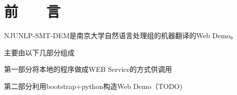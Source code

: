 
\chapter*{\hfill 前　　言 \hfill}
\label{chap00}

NJUNLP-SMT-DEM是南京大学自然语言处理组的机器翻译的Web Demo。

主要由以下几部分组成

第一部分将本地的程序做成WEB Service的方式供调用

第二部分利用bootstrap+python构造Web Demo（TODO)
